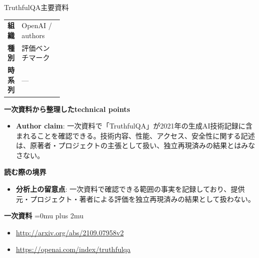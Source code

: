 \begin{technicalnote}{TruthfulQA}{主要資料}
\begingroup
\begin{tabularx}{\linewidth}{@{}>{\bfseries}p{0.22\linewidth}X@{}}
組織 & OpenAI / authors \\
種別 & 評価ベンチマーク \\
時系列 & — \\
\end{tabularx}
\smallskip
{\bfseries 一次資料から整理したtechnical points}
\begin{itemize}[leftmargin=1.5em,itemsep=0.35em]
\item \textbf{Author claim}: 一次資料で「TruthfulQA」が2021年の生成AI技術記録に含まれることを確認できる。技術内容、性能、アクセス、安全性に関する記述は、原著者・プロジェクトの主張として扱い、独立再現済みの結果とはみなさない。
\end{itemize}
\begin{minipage}{\linewidth}
{\bfseries 読む際の境界}
\begin{itemize}[leftmargin=1.5em,itemsep=0.35em]
\item \textbf{分析上の留意点}: 一次資料で確認できる範囲の事実を記録しており、提供元・プロジェクト・著者による評価を独立再現済みの結果として扱わない。
\end{itemize}
\begin{samepage}
{\bfseries 一次資料}
\begingroup\sloppy
\Urlmuskip=0mu plus 2mu\relax
\begin{itemize}[leftmargin=1.5em,itemsep=0.25em]
\item {\scriptsize\url{http://arxiv.org/abs/2109.07958v2}}
\item {\scriptsize\url{https://openai.com/index/truthfulqa}}
\end{itemize}
\endgroup
\end{samepage}
\end{minipage}
\endgroup
\end{technicalnote}
\medskip

